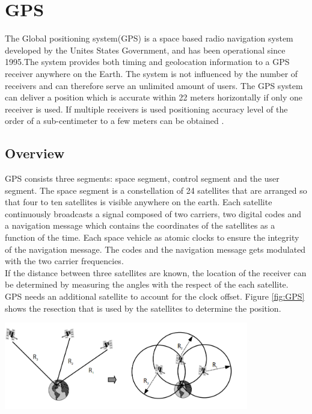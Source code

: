 




\section{GPS}
The Global positioning system(GPS) is a space based radio navigation system developed by the Unites States Government, and has been operational since 1995.The system provides both timing and geolocation information to a GPS receiver anywhere on the Earth.  The system is not influenced by the number of receivers and can therefore serve an unlimited amount of users. The GPS system can deliver a position which is accurate within 22 meters horizontally if only one receiver is used. If multiple receivers is used positioning accuracy level of the order of a sub-centimeter to a few meters can be obtained \cite{GPS}. 

\subsection{Overview}
GPS consists three segments: space segment, control segment and the user segment. The space segment is a constellation of 24 satellites that are arranged so that  four to ten satellites is visible anywhere on the earth. Each satellite continuously broadcasts a signal composed of two carriers, two digital codes and a navigation message which contains the coordinates of the satellites as a function of the time. Each space vehicle as atomic clocks to ensure the integrity of the navigation message. The codes and the navigation message gets modulated with the two carrier frequencies.  \\If the distance between three satellites are known, the location of the receiver can be determined by measuring the angles with the respect of the each satellite.  GPS needs an additional satellite to account for the clock offset. Figure \ref{fig:GPS} shows the resection that is used by the satellites to determine the position.\\

\begin{minipage}[t]{0.8\textwidth}
\centering
    \includegraphics[width=0.8\textwidth]{Images/gps.PNG}\\
    \captionsetup{justification=centering}
    \label{fig:GPS}
\end{minipage}


